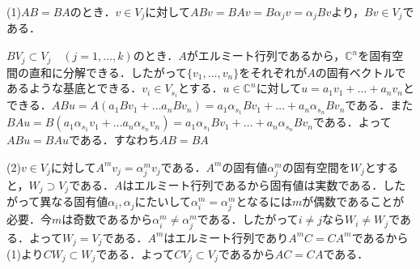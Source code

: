 \documentclass[
		book,
		head_space=20mm,
		foot_space=20mm,
		gutter=10mm,
		line_length=190mm
]{jlreq}
\begin{document}
(1)$AB=BA$のとき．$v\in V_j$に対して$ABv=BAv=B\alpha_jv=\alpha_jBv$より，$ Bv \in V_j$である．

$BV_j\subset V_j \quad(j=1,\dots,k)$のとき．$A$がエルミート行列であるから，$\mathbb{C}^n$を固有空間の直和に分解できる．したがって$\{v_1,\dots,v_n\}$をそれぞれが$A$の固有ベクトルであるような基底とできる．$v_i \in V_{s_i}$とする．$u \in \mathbb{C}^n$に対して$u=a_1v_1+\dots+a_nv_n$とできる．$ABu=A (a_1Bv_1+\dots a_nBv_n)=a_1\alpha_{s_1}Bv_1+\dots+a_n\alpha_{s_n}Bv_n$である．また$BAu=B (a_1\alpha_{s_1}v_1+\dots a_n\alpha_{s_n}v_n)=a_1\alpha_{s_1}Bv_1+\dots+a_n\alpha_{s_n}Bv_n$である．よって$ABu=BAu$である．すなわち$AB=BA$

(2)$v \in V_j$に対して$A^mv_j=\alpha_j^m v_j$である．$A^m$の固有値$\alpha_j^m$の固有空間を$W_j$とすると，$W_j\supset V_j$である．$A$はエルミート行列であるから固有値は実数である．したがって異なる固有値$\alpha_i,\alpha_j$にたいして$\alpha_i^m=\alpha_j^m$となるには$m$が偶数であることが必要．今$m$は奇数であるから$\alpha_i^m\neq \alpha_j^m$である．したがって$i\neq j$なら$W_i\neq W_j$である．よって$W_j=V_j$である．$A^m$はエルミート行列であり$A^mC=CA^m$であるから(1)より$CW_j\subset W_j$である．よって$CV_j \subset V_j$であるから$AC=CA$である．
\end{document}
